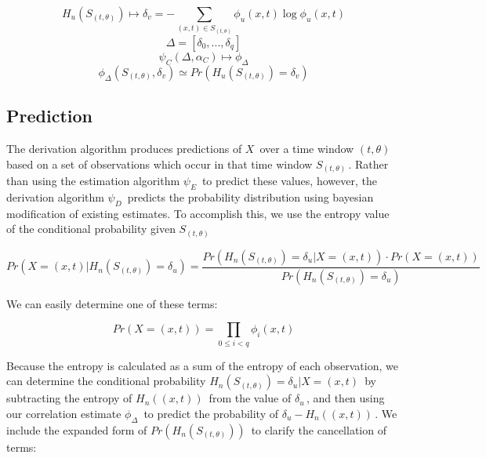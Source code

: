 \documentclass[10pt]{article}
\begin{document}
\begin{equation} H_u( S_{(t,\theta)} ) \mapsto \delta_v = -\sum_{(x,t) \in S_{(t,\theta)}} \phi_u(x,t) \log \phi_u(x,t) \end{equation}
\[ \Delta = [\delta_0,...,\delta_q] \]
\begin{equation} \psi_C( \Delta , \alpha_C ) \mapsto \phi_\Delta \end{equation}
\begin{equation} \phi_\Delta(S_{(t,\theta)},\delta_v) \simeq Pr \left( H_u(S_{(t,\theta)}) = \delta_v \right)
\end{equation}

\subsection{Prediction}
The derivation algorithm produces predictions of \(X \,\!\) over a time window \((t,\theta) \,\!\) based on a set of observations which occur in that time window \(S_{(t,\theta)} \,\!\).  Rather than using the estimation algorithm \(\psi_E \,\!\) to predict these values, however, the derivation algorithm \(\psi_D \,\!\) predicts the probability distribution  using bayesian modification of existing estimates.  To accomplish this, we use the entropy value of the conditional probability given \(S_{(t,\theta)} \,\!\)

\begin{equation} Pr \left( X = (x,t) | H_n(S_{(t,\theta)}) = \delta_u \right) = \frac { Pr \left( H_n( S_{(t,\theta)} ) = \delta_u | X = (x,t) \right) \cdot Pr \left( X = (x,t) \right) } { Pr \left( H_n( S_{(t,\theta)} ) = \delta_u \right) } \end{equation}

We can easily determine one of these terms:

\begin{equation} Pr \left( X = (x,t) \right) = \prod_{0 \le i < q} \phi_i(x,t) \end{equation}

Because the entropy is calculated as a sum of the entropy of each observation, we can determine the conditional probability \(H_n(S_{(t,\theta)}) = \delta_u | X = (x,t) \,\!\) by subtracting the entropy of \(H_n((x,t)) \,\!\) from the value of \(\delta_u \,\!\), and then using our correlation estimate \(\phi_\Delta \,\!\) to predict the probability of \(\delta_u - H_n((x,t)) \,\!\).  We include the expanded form of \(Pr( H_n(S_{(t,\theta)}) ) \,\!\) to clarify the cancellation of terms:
\end{document}
